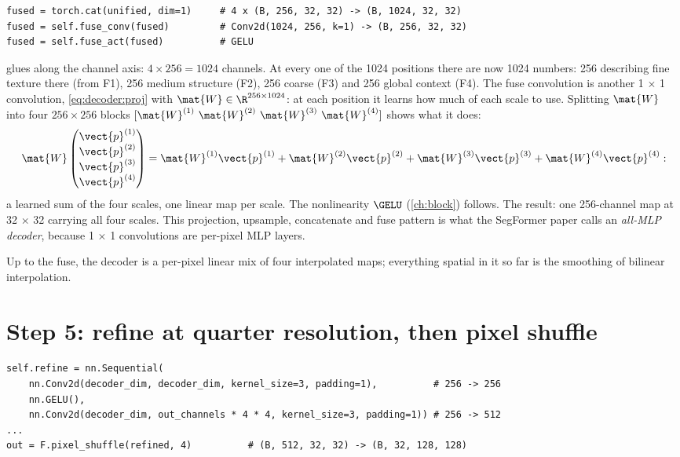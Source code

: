 \begin{lstlisting}
fused = torch.cat(unified, dim=1)     # 4 x (B, 256, 32, 32) -> (B, 1024, 32, 32)
fused = self.fuse_conv(fused)         # Conv2d(1024, 256, k=1) -> (B, 256, 32, 32)
fused = self.fuse_act(fused)          # GELU
\end{lstlisting}
 glues along the channel axis: $4 \times 256 = 1024$ channels. At every
one of the 1024 positions there are now 1024 numbers: 256 describing fine texture there (from F1), 256
medium structure (F2), 256 coarse (F3) and 256 global context (F4). The fuse convolution is another 1
$\times$ 1 convolution, \eqref{eq:decoder:proj} with $\mat{W} \in \R^{256 \times 1024}$: at each
position it learns how much of each scale to use. Splitting $\mat{W}$ into four $256 \times 256$ blocks
$[\mat{W}^{(1)}\ \mat{W}^{(2)}\ \mat{W}^{(3)}\ \mat{W}^{(4)}]$ shows what it does:
\[
\mat{W} \begin{pmatrix} \vect{p}^{(1)}\\ \vect{p}^{(2)}\\ \vect{p}^{(3)}\\ \vect{p}^{(4)} \end{pmatrix}
= \mat{W}^{(1)}\vect{p}^{(1)} + \mat{W}^{(2)}\vect{p}^{(2)} + \mat{W}^{(3)}\vect{p}^{(3)} + \mat{W}^{(4)}\vect{p}^{(4)} :
\]
a learned sum of the four scales, one linear map per scale. The nonlinearity $\GELU$
(\cref{ch:block}) follows. The result: one 256-channel map at 32 $\times$ 32 carrying all four scales.
This projection, upsample, concatenate and fuse pattern is what the SegFormer paper calls an
\emph{all-MLP decoder}, because 1 $\times$ 1 convolutions are per-pixel MLP layers.

\begin{keypoint}
Up to the fuse, the decoder is a per-pixel linear mix of four interpolated maps; everything spatial in
it so far is the smoothing of bilinear interpolation.
\end{keypoint}

\section{Step 5: refine at quarter resolution, then pixel shuffle}\label{sec:decoder:shuffle}

\begin{lstlisting}
self.refine = nn.Sequential(
    nn.Conv2d(decoder_dim, decoder_dim, kernel_size=3, padding=1),          # 256 -> 256
    nn.GELU(),
    nn.Conv2d(decoder_dim, out_channels * 4 * 4, kernel_size=3, padding=1)) # 256 -> 512
...
out = F.pixel_shuffle(refined, 4)          # (B, 512, 32, 32) -> (B, 32, 128, 128)
\end{lstlisting}

